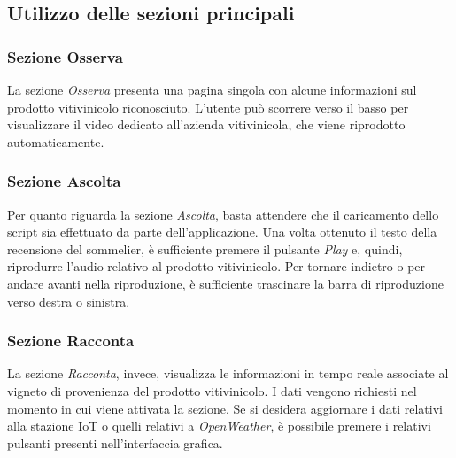 \subsection{Utilizzo delle sezioni principali}

\subsubsection{Sezione Osserva}

La sezione \textit{Osserva} presenta una pagina singola con alcune informazioni sul prodotto vitivinicolo riconosciuto. L'utente può scorrere verso il basso per visualizzare il video dedicato all'azienda vitivinicola, che viene riprodotto automaticamente.

\subsubsection{Sezione Ascolta}

Per quanto riguarda la sezione \textit{Ascolta}, basta attendere che il caricamento dello script sia effettuato da parte dell'applicazione. Una volta ottenuto il testo della recensione del sommelier, è sufficiente premere il pulsante \textit{Play} e, quindi, riprodurre l'audio relativo al prodotto vitivinicolo. Per tornare indietro o per andare avanti nella riproduzione, è sufficiente trascinare la barra di riproduzione verso destra o sinistra.

\subsubsection{Sezione Racconta}

La sezione \textit{Racconta}, invece, visualizza le informazioni in tempo reale associate al vigneto di provenienza del prodotto vitivinicolo. I dati vengono richiesti nel momento in cui viene attivata la sezione. Se si desidera aggiornare i dati relativi alla stazione IoT o quelli relativi a \textit{OpenWeather}, è possibile premere i relativi pulsanti presenti nell'interfaccia grafica.
